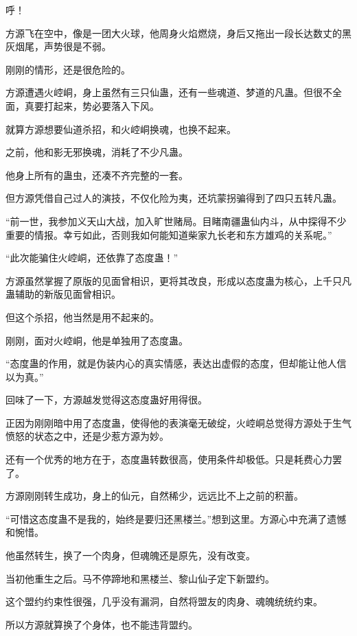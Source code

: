 
\begin{this_body}

呼！

方源飞在空中，像是一团大火球，他周身火焰燃烧，身后又拖出一段长达数丈的黑灰烟尾，声势很是不弱。

刚刚的情形，还是很危险的。

方源遭遇火崆峒，身上虽然有三只仙蛊，还有一些魂道、梦道的凡蛊。但很不全面，真要打起来，势必要落入下风。

就算方源想要仙道杀招，和火崆峒换魂，也换不起来。

之前，他和影无邪换魂，消耗了不少凡蛊。

他身上所有的蛊虫，还凑不齐完整的一套。

但方源凭借自己过人的演技，不仅化险为夷，还坑蒙拐骗得到了四只五转凡蛊。

“前一世，我参加义天山大战，加入旷世赌局。目睹南疆蛊仙内斗，从中探得不少重要的情报。幸亏如此，否则我如何能知道柴家九长老和东方雄鸡的关系呢。”

“此次能骗住火崆峒，还依靠了态度蛊！”

方源虽然掌握了原版的见面曾相识，更将其改良，形成以态度蛊为核心，上千只凡蛊辅助的新版见面曾相识。

但这个杀招，他当然是用不起来的。

刚刚，面对火崆峒，他是单独用了态度蛊。

“态度蛊的作用，就是伪装内心的真实情感，表达出虚假的态度，但却能让他人信以为真。”

回味了一下，方源越发觉得这态度蛊好用得很。

正因为刚刚暗中用了态度蛊，使得他的表演毫无破绽，火崆峒总觉得方源处于生气愤怒的状态之中，还是少惹方源为妙。

还有一个优秀的地方在于，态度蛊转数很高，使用条件却极低。只是耗费心力罢了。

方源刚刚转生成功，身上的仙元，自然稀少，远远比不上之前的积蓄。

“可惜这态度蛊不是我的，始终是要归还黑楼兰。”想到这里。方源心中充满了遗憾和惋惜。

他虽然转生，换了一个肉身，但魂魄还是原先，没有改变。

当初他重生之后。马不停蹄地和黑楼兰、黎山仙子定下新盟约。

这个盟约约束性很强，几乎没有漏洞，自然将盟友的肉身、魂魄统统约束。

所以方源就算换了个身体，也不能违背盟约。


\end{this_body}
